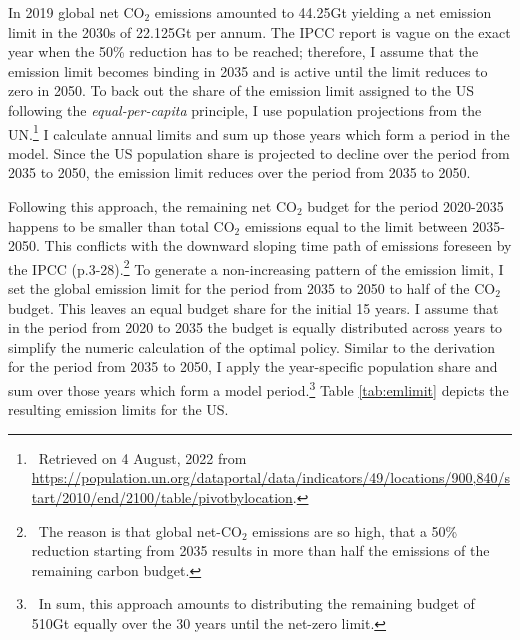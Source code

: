 % 
 In 2019 global net CO$_2$ emissions amounted to 44.25Gt \citep[compare figure SPM1.a p.11 in ][]{IPCCSPM} yielding a net emission limit in the 2030s of 22.125Gt per annum. The IPCC report is vague on the exact year when the 50\% reduction has to be reached; therefore, I assume that the emission limit becomes binding in 2035 and is active until the limit reduces to zero in 2050. 
 To back out the share of the emission limit assigned to the US following the \textit{equal-per-capita} principle, I use population projections from the UN.\footnote{\ Retrieved on 4 August, 2022 from \url{https://population.un.org/dataportal/data/indicators/49/locations/900,840/start/2010/end/2100/table/pivotbylocation}.} 
 I calculate annual limits and sum up those years which form a period in the model.  Since the US population share is projected to decline over the period from 2035 to 2050, the emission limit reduces over the period from 2035 to 2050. 
 
 Following this approach, the remaining net CO$_2$ budget for the period 2020-2035 happens to be smaller than total CO$_2$ emissions equal to the limit between 2035-2050. This conflicts with the downward sloping time path of emissions foreseen by the IPCC (p.3-28).\footnote{\ The reason is that global net-CO$_2$ emissions are so high, that a 50\% reduction starting from 2035 results in more than half the emissions of the remaining carbon budget. }
 To generate a non-increasing pattern of the emission limit, I set the global emission limit for the period from 2035 to 2050 to half of the CO$_2$ budget. This leaves an equal budget share for the initial 15 years. I assume that in the period from 2020 to 2035 the budget is equally distributed across years to simplify the numeric calculation of the optimal policy. Similar to the derivation for the period from 2035 to 2050, I apply the year-specific population share and sum over those years which form a model period.\footnote{\ In sum, this approach amounts to distributing the remaining budget of 510Gt equally over the 30 years until the net-zero limit.} Table \ref{tab:emlimit}  depicts the resulting emission limits for the US.
 
